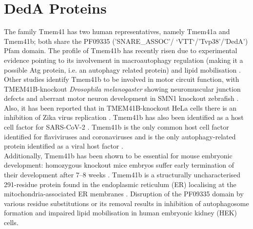 \section{DedA Proteins}
The family Tmem41 has two human representatives, namely Tmem41a and Tmem41b; both share the PF09335 ('SNARE{\_}ASSOC'/ ‘VTT‘/’Tvp38’/’DedA’) Pfam \cite{El-Gebali2019} domain. The profile of Tmem41b has recently risen due to experimental evidence pointing to its involvement in macroautophagy regulation (making it a possible Atg protein, i.e. an autophagy related protein) and lipid mobilisation \cite{Moretti2018}. Other studies identify Tmem41b to be involved in motor circuit function, with TMEM41B-knockout \emph{Drosophila melanogaster} showing neuromuscular junction defects and aberrant motor neuron development in SMN1 knockout zebrafish \cite{Lotti2012}. Also, it has been reported that in TMEM41B-knockout HeLa cells there is an inhibition of Zika virus replication \cite{Scaturro2018}. Tmem41b has also been identified as a host cell factor for SARS-CoV-2 \cite{Schneider2020}. Tmem41b is the only common host cell factor identified for flaviviruses and coronaviruses and is the only autophagy-related protein identified as a viral host factor \cite{Hoffmann2021}.\\
Additionally, Tmem41b has been shown to be essential for mouse embryonic development: homozygous knockout mice embryos suffer early termination of their development after 7–8 weeks \cite{VanAlstyne2018}. Tmem41b is a structurally uncharacterised 291-residue protein found in the endoplasmic reticulum (ER) localising at the mitochondria-associated ER membranes \cite{Moretti2018}. Disruption of the PF09335 domain by various residue substitutions \cite{Tabara2019} or its removal \cite{Moretti2018} results in inhibition of autophagosome formation and impaired lipid mobilisation in human embryonic kidney (HEK) cells.\\

